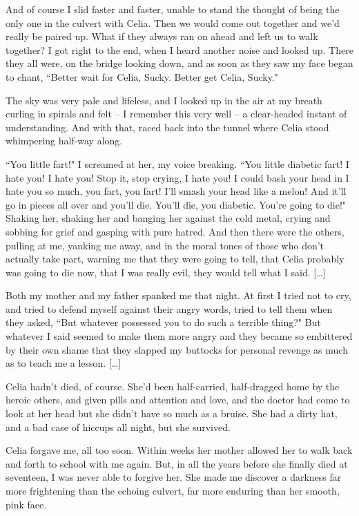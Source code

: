 \documentclass[10pt,a4paper]{article}
\newcommand{\qm}[1]{``#1"}
\begin{document}
And of course I slid faster and faster, unable to stand the thought of being the only one in the culvert with Celia. Then we would come out together and we'd really be paired up. What if they always ran on ahead and left us to walk together? I got right to the end, when I heard another noise and looked up. There they all were, on the bridge looking down, and as soon as they saw my face began to chant, \qm{Better wait for Celia, Sucky. Better get Celia, Sucky.}

The sky was very pale and lifeless, and I looked up in the air at my breath curling in spirals and felt -- I remember this very well -- a clear-headed instant of understanding. And with that, raced back into the tunnel where Celia stood whimpering half-way along.

\qm{You little fart!} I screamed at her, my voice breaking. \qm{You little diabetic fart! I hate you! I hate you! Stop it, stop crying, I hate you! I could bash your head in I hate you so much, you fart, you fart! I'll smash your head like a melon! And it'll go in pieces all over and you'll die. You'll die, you diabetic. You're going to die!} Shaking her, shaking her and banging her against the cold metal, crying and sobbing for grief and gasping with pure hatred. And then there were the others, pulling at me, yanking me away, and in the moral tones of those who don't actually take part, warning me that they were going to tell, that Celia probably was going to die now, that I was really evil, they would tell what I said. [\ldots]

Both my mother and my father spanked me that night. At first I tried not to cry, and tried to defend myself against their angry words, tried to tell them when they asked, \qm{But whatever possessed you to do such a terrible thing?} But whatever I said seemed to make them more angry and they became so embittered by their own shame that they slapped my buttocks for personal revenge as much as to teach me a lesson. [\ldots]

Celia hadn't died, of course. She'd been half-carried, half-dragged home by the heroic others, and given pills and attention and love, and the doctor had come to look at her head but she didn't have so much as a bruise. She had a dirty hat, and a bad case of hiccups all night, but she survived.

Celia forgave me, all too soon. Within weeks her mother allowed her to walk back and forth to school with me again. But, in all the years before she finally died at seventeen, I was never able to forgive her. She made me discover a darkness far more frightening than the echoing culvert, far more enduring than her smooth, pink face.
\end{document}
